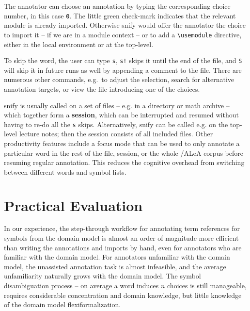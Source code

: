 \documentclass{llncs}
\newcommand\ALeA{\textsf{ALeA}\xspace}
\newcommand\snify{\textsf{snify}\xspace}
\begin{document}
The annotator can choose an annotation by typing the corresponding choice number,
in this case \lstinline|0|.
The little green check-mark indicates that the relevant module is already imported.
Otherwise \snify would offer the annotator the choice to import it -- if we are
in a module context -- or to add a \lstinline|\usemodule| directive, either in the
local environment or at the top-level.

To skip the word, the user can type \lstinline|s|,
\lstinline|s!| skips it until the end of the file, and \lstinline|S|
will skip it in future runs as well by appending a comment to the file.
There are numerous other commands, e.g.\ to adjust the selection,
search for alternative annotation targets,
or view the file introducing one of the choices.

\snify is usually called on a set of files -- e.g. in a directory or math archive -- which
together form a \textbf{session}, which can be interrupted and resumed without having to
re-do all the \lstinline|s| skips. Alternatively, \snify can be called e.g. on the top-level
lecture notes; then the session consists of all included files. Other productivity
features include a focus mode that can be used to only annotate a particular word in the
rest of the file, session, or the whole \sTeX/\ALeA corpus before resuming regular
annotation. This reduces the cognitive overhead from switching between different 
words and symbol lists.

\section{Practical Evaluation}

In our experience, the step-through workflow for annotating term references for symbols
from the domain model is almost an order of magnitude more efficient than writing the
annotations and imports by hand, even for annotators who are familiar with the domain
model. For annotators unfamiliar with the domain model, the unassisted annotation task is
almost infeasible, and the average unfamiliarity naturally grows with the domain
model. The symbol disambiguation process -- on average a word induces $n$ choices is still manageable,
requires considerable concentration and domain knowledge, but little knowledge of the
domain model flexiformalization.
\end{document}
